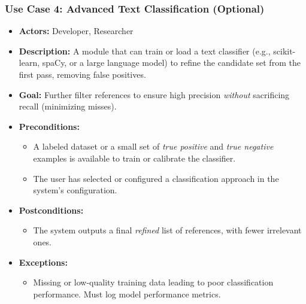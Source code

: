 \documentclass[12pt]{article}
\begin{document}
\subsubsection{Use Case 4: Advanced Text Classification (Optional)}
\begin{itemize}
  \item \textbf{Actors:} Developer, Researcher
  \item \textbf{Description:} A module that can train or load a text classifier (e.g., scikit-learn, spaCy, or a large language model) to refine the candidate set from the first pass, removing false positives. 
  \item \textbf{Goal:} Further filter references to ensure high precision \emph{without} sacrificing recall (minimizing misses).
  \item \textbf{Preconditions:}
    \begin{itemize}
      \item A labeled dataset or a small set of \emph{true positive} and \emph{true negative} examples is available to train or calibrate the classifier.
      \item The user has selected or configured a classification approach in the system’s configuration.
    \end{itemize}
  \item \textbf{Postconditions:}
    \begin{itemize}
      \item The system outputs a final \emph{refined} list of references, with fewer irrelevant ones.
    \end{itemize}
  \item \textbf{Exceptions:}
    \begin{itemize}
      \item Missing or low-quality training data leading to poor classification performance. Must log model performance metrics.
    \end{itemize}
\end{itemize}
\end{document}
